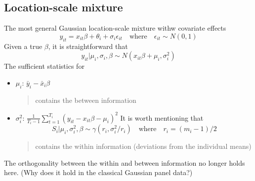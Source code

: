 \subsection{Location-scale mixture}
The most general Gaussian location-scale mixture withw covariate effects
\begin{equation*}
    y_{it}=x_{it}\beta+\theta_i+\sigma_i\epsilon_{it} \quad \text{where} \quad \epsilon_{it}\sim N(0,1)
\end{equation*}
Given a true $\beta$, it is straightforward that \begin{equation*}
    y_{it}|\mu_i,\sigma_i,\beta \sim N(x_{it}\beta+\mu_i,\sigma_i^2)
\end{equation*}
The sufficient statistics for
\begin{itemize}
    \item $\mu_i$: $\bar{y}_i-\bar{x}_i\beta$
          \begin{quote}
              contains the between information
          \end{quote}
    \item $\sigma_i^2$: $\frac{1}{T_i-1}\sum_{t=1}^{T_i}(y_{it}-x_{it}\beta-\mu_i)^2$
          It is worth mentioning that \begin{equation*}
              S_i|\mu_i,\sigma_i^2,\beta \sim \gamma(r_i,\sigma_i^2/r_i) \quad \text{where} \quad r_i=(m_i-1)/2
          \end{equation*}
          \begin{quote}
              contains the within information (deviations from the individual means)
          \end{quote}
\end{itemize}
\begin{remark}
    The orthogonality between the within and between information no longer holds here. (Why does it hold in the classical Gaussian panel data?)
\end{remark}
